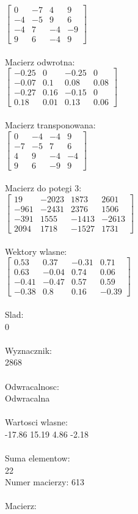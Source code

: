 \documentclass[a4paper,12pt]{article}
\begin{document}
$\begin{bmatrix} 0&-7&4&9\\-4&-5&9&6\\-4&7&-4&-9\\9&6&-4&9 \end{bmatrix}$
\\
\\
Macierz odwrotna:\\

$\begin{bmatrix} -0.25&0&-0.25&0\\-0.07&0.1&0.08&0.08\\-0.27&0.16&-0.15&0\\0.18&0.01&0.13&0.06 \end{bmatrix}$
\\
\\
Macierz transponowana:\\

$\begin{bmatrix} 0&-4&-4&9\\-7&-5&7&6\\4&9&-4&-4\\9&6&-9&9 \end{bmatrix}$
\\
\\
Macierz do potegi 3:\\

$\begin{bmatrix} 19&-2023&1873&2601\\-961&-2431&2376&1506\\-391&1555&-1413&-2613\\2094&1718&-1527&1731 \end{bmatrix}$
\\
\\
Wektory wlasne:\\

$\begin{bmatrix} 0.53&0.37&-0.31&0.71\\0.63&-0.04&0.74&0.06\\-0.41&-0.47&0.57&0.59\\-0.38&0.8&0.16&-0.39 \end{bmatrix}$
\\
\\
Slad:\\
0
\\
\\
Wyznacznik:\\
2868
\\
\\
Odwracalnosc:\\
Odwracalna
\\
\\
Wartosci wlasne:\\
-17.86 15.19 4.86 -2.18
\\
\\
Suma elementow:\\
22
\\
\newpage
Numer macierzy:
613
\\
\\
Macierz:\\
\end{document}
